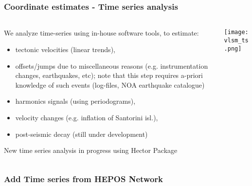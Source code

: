 \begin{frame}
  \frametitle{Coordinate estimates - Time series analysis}
  \framesubtitle{}
  \label{}
  \vskip-1cm
  \begin{columns}[T]
    \begin{column}{.4\textwidth}
      \footnotesize{
      We analyze time-series using in-house software tools, to estimate:
      \begin{itemize}
        \item tectonic velocities (linear trends),
        \item offsets/jumps due to miscellaneous reasons (e.g. instrumentation 
          changes, earthquakes, etc); note that this step requires a-priori 
          knowledge of such events (log-files, NOA earthquake catalogue)
        \item harmonics signals (using periodograms),
        \item velocity changes (e.g. inflation of Santorini isl.),
        \item post-seismic decay (still under development)
      \end{itemize}}
      New time series analysis in progress using Hector Package \citep{Bos2012}
    \end{column}
    \begin{column}{.6\textwidth}
      \begin{center}
        \texttt{[image: vlsm\_ts.png]}
      \end{center}
    \end{column}
  \end{columns}
 
\end{frame}
\note{}

\begin{frame}
  \frametitle{Add Time series from HEPOS Network}
  \framesubtitle{}
  \label{}

\end{frame}
\note{}

%       
%      


